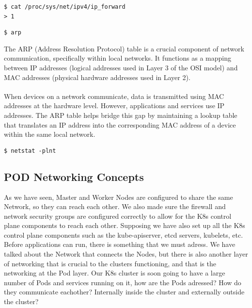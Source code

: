 \documentclass{article}
\newenvironment{blocktemplateII}[1]{%
    \tcolorbox[beamer,%
    noparskip,breakable,
    colframe=Green,%
    colbacklower=LimeGreen!75!LightGreen,%
    title=#1]}%
    {\endtcolorbox}
\newenvironment{codetemplate}[1][]{%
  \mybasecolorbox[#1]
  \itshape
}{%
  \endmybasecolorbox
}
\begin{document}
\begin{codetemplate}{}
\begin{verbatim}
$ cat /proc/sys/net/ipv4/ip_forward
> 1
\end{verbatim}
\end{codetemplate}

\begin{codetemplate}{}
\begin{verbatim}
$ arp
\end{verbatim}
\end{codetemplate}

\begin{blocktemplateII}{NOTE}
The ARP (Address Resolution Protocol) table is a crucial component of network communication, specifically within local networks. It functions as a mapping between IP addresses (logical addresses used in Layer 3 of the OSI model) and MAC addresses (physical hardware addresses used in Layer 2).
\\\\
When devices on a network communicate, data is transmitted using MAC addresses at the hardware level. However, applications and services use IP addresses. The ARP table helps bridge this gap by maintaining a lookup table that translates an IP address into the corresponding MAC address of a device within the same local network.
\end{blocktemplateII}

\begin{codetemplate}{}
\begin{verbatim}
$ netstat -plnt
\end{verbatim}
\end{codetemplate}

\subsection{POD Networking Concepts}

As we have seen, Master and Worker Nodes are configured to share the same Network, so they can reach each other. We also made sure the firewall and network security groups are configured correctly to allow for the K8s control plane components to reach each other. Supposing we have also set up all the K8s control plane components such as the kube-apiserver, etcd servers, kubelets, etc. Before applications can run, there is something that we must adress. We have talked about the Network that connects the Nodes,  but there is also another layer of networking that is crucial to the clusters functioning, and that is the networking at the Pod layer. Our K8s cluster is soon going to have a large number of Pods and services running on it, how are the Pods adressed? How do they communicate eachother? Internally inside the cluster and externally outside the cluster?
\end{document}
